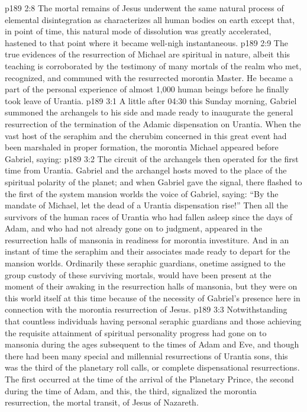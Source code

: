 \vs p189 2:8 The mortal remains of Jesus underwent the same natural process of elemental disintegration as characterizes all human bodies on earth except that, in point of time, this natural mode of dissolution was greatly accelerated, hastened to that point where it became well\hyp{}nigh instantaneous.
\vs p189 2:9 The true evidences of the resurrection of Michael are spiritual in nature, albeit this teaching is corroborated by the testimony of many mortals of the realm who met, recognized, and communed with the resurrected morontia Master. He became a part of the personal experience of almost 1,000 human beings before he finally took leave of Urantia.
\vs p189 3:1 A little after 04:30 this Sunday morning, Gabriel summoned the archangels to his side and made ready to inaugurate the general resurrection of the termination of the Adamic dispensation on Urantia. When the vast host of the seraphim and the cherubim concerned in this great event had been marshaled in proper formation, the morontia Michael appeared before Gabriel, saying: 
\vs p189 3:2 The circuit of the archangels then operated for the first time from Urantia. Gabriel and the archangel hosts moved to the place of the spiritual polarity of the planet; and when Gabriel gave the signal, there flashed to the first of the system mansion worlds the voice of Gabriel, saying: “By the mandate of Michael, let the dead of a Urantia dispensation rise!” Then all the survivors of the human races of Urantia who had fallen asleep since the days of Adam, and who had not already gone on to judgment, appeared in the resurrection halls of mansonia in readiness for morontia investiture. And in an instant of time the seraphim and their associates made ready to depart for the mansion worlds. Ordinarily these seraphic guardians, onetime assigned to the group custody of these surviving mortals, would have been present at the moment of their awaking in the resurrection halls of mansonia, but they were on this world itself at this time because of the necessity of Gabriel’s presence here in connection with the morontia resurrection of Jesus.
\vs p189 3:3 Notwithstanding that countless individuals having personal seraphic guardians and those achieving the requisite attainment of spiritual personality progress had gone on to mansonia during the ages subsequent to the times of Adam and Eve, and though there had been many special and millennial resurrections of Urantia sons, this was the third of the planetary roll calls, or complete dispensational resurrections. The first occurred at the time of the arrival of the Planetary Prince, the second during the time of Adam, and this, the third, signalized the morontia resurrection, the mortal transit, of Jesus of Nazareth.

